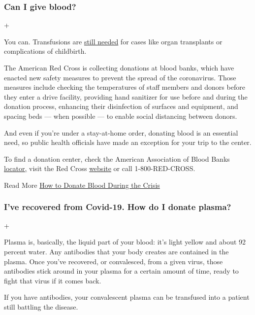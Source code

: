 \hypertarget{can-i-give-blood}{%
\subsubsection{Can I give blood?}\label{can-i-give-blood}}

+

You can. Transfusions are
\href{https://docs.google.com/document/d/1Ep_tZsoeCO6fLGDmD58CetFzaKk1uUwkAEoa_CQ1p0U/edit?ts=5f0dc4a0}{still
needed} for cases like organ transplants or complications of childbirth.

The American Red Cross is collecting donations at blood banks, which
have enacted new safety measures to prevent the spread of the
coronavirus. Those measures include checking the temperatures of staff
members and donors before they enter a drive facility, providing hand
sanitizer for use before and during the donation process, enhancing
their disinfection of surfaces and equipment, and spacing beds --- when
possible --- to enable social distancing between donors.

And even if you're under a stay-at-home order, donating blood is an
essential need, so public health officials have made an exception for
your trip to the center.

To find a donation center, check the American Association of Blood Banks
\href{http://www.aabb.org/tm/donation/Pages/Blood-Bank-Locator.aspx}{locator,}
visit the Red Cross \href{https://www.redcrossblood.org/}{website} or
call 1-800-RED-CROSS.

Read More
\href{https://www.nytimes3xbfgragh.onion/2020/03/19/well/live/coronavirus-blood-donation.html}{How
to Donate Blood During the Crisis}

\hypertarget{ive-recovered-from-covid-19-how-do-i-donate-plasma}{%
\subsubsection{I've recovered from Covid-19. How do I donate
plasma?}\label{ive-recovered-from-covid-19-how-do-i-donate-plasma}}

+

Plasma is, basically, the liquid part of your blood: it's light yellow
and about 92 percent water. Any antibodies that your body creates are
contained in the plasma. Once you've recovered, or convalesced, from a
given virus, those antibodies stick around in your plasma for a certain
amount of time, ready to fight that virus if it comes back.

If you have antibodies, your convalescent plasma can be transfused into
a patient still battling the disease.

